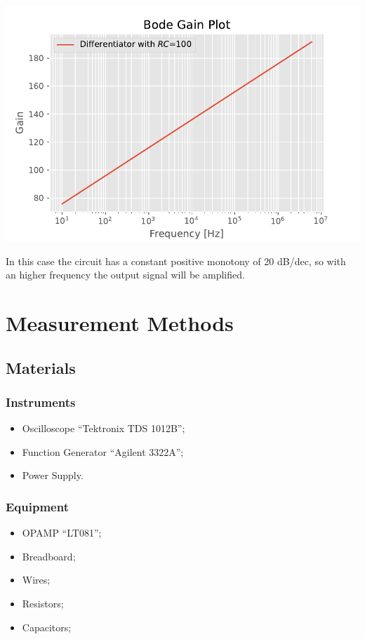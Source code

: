 \documentclass[a4paper,twocolumn]{article}
\begin{document}
\begin{center}
    \includegraphics[width=\columnwidth]{graph/DifferentiatorBodeTheo}
    \label{fig:DiffBodeGraphTheo}
\end{center}
In this case the circuit has a constant positive monotony of 20 dB/dec, so with an higher frequency the output signal will be amplified.

\section{Measurement Methods}

\subsection{Materials}
\subsubsection{Instruments}
\begin{itemize}
    \item Oscilloscope ``Tektronix TDS 1012B'';
    \item Function Generator ``Agilent 3322A'';
    \item Power Supply.
\end{itemize}
\subsubsection{Equipment}
\begin{itemize}
    \item OPAMP ``LT081'';
    \item Breadboard;
    \item Wires;
    \item Resistors;
    \item Capacitors;
\end{itemize}
\end{document}
